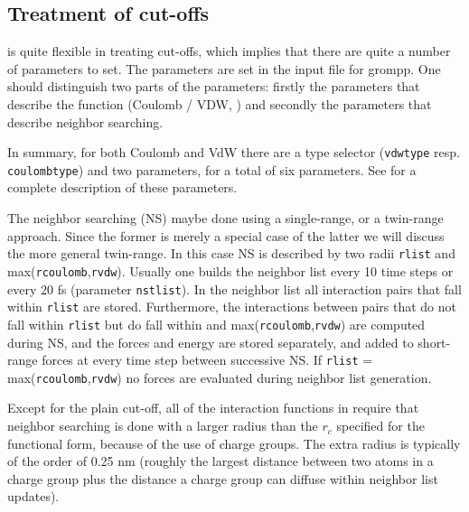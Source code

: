 \subsection{Treatment of cut-offs}
\newcommand{\rs}{$r_{short}$}
\newcommand{\rl}{$r_{long}$}
{\gromacs} is quite flexible in treating cut-offs, which implies
that there are quite a number of parameters to set. The parameters are
set in the input file for grompp. One should distinguish two parts of
the parameters: firstly the parameters that describe the function
(Coulomb / VDW,
) and
secondly the parameters that describe neighbor searching.

In summary, for both Coulomb and VdW there are a type selector
({\tt vdwtype} resp. {\tt coulombtype}) and two parameters,
for a total of six parameters. See  for a complete
description of these parameters.

The neighbor searching (NS) maybe done using a single-range, or a twin-range 
approach. Since the former is merely a special case of the latter we will 
discuss the more general twin-range. In this case NS is described by two
radii {\tt rlist} and max({\tt rcoulomb},{\tt rvdw}).
Usually one builds the neighbor list every 10 time steps
or every 20 fs (parameter {\tt nstlist}). In the neighbor list all interaction 
pairs that  fall within {\tt rlist} are stored. Furthermore, the 
interactions between pairs that do not
fall within {\tt rlist} but do fall within and max({\tt rcoulomb},{\tt rvdw})
are computed during NS, and the
forces and energy are stored separately, and added to short-range forces
at every time step between successive NS. If {\tt rlist} = 
max({\tt rcoulomb},{\tt rvdw}) no forces
are evaluated during neighbor list generation.

Except for the plain cut-off,
all of the interaction functions in 
require that neighbor searching is done with a larger radius than the $r_c$
specified for the functional form, because of the use of charge groups.
The extra radius is typically of the order of 0.25 nm (roughly the 
largest distance between two atoms in a charge group plus the distance a 
charge group can diffuse within neighbor list updates).



